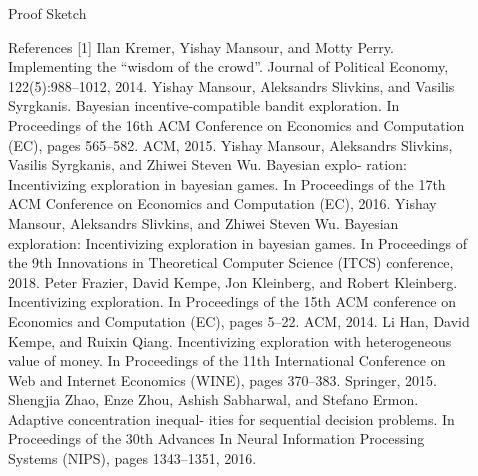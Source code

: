 \documentclass[final]{beamer}
\newlength{\sepwid}
\newlength{\onecolwid}
\begin{document}
\begin{frame}[t]
\begin{columns}[t]
\begin{column}{\onecolwid}
\begin{block}{Proof Sketch}
\end{block}
\begin{block}{References}
[1] Ilan Kremer, Yishay Mansour, and Motty Perry. Implementing the “wisdom of the crowd”. Journal of Political Economy, 122(5):988–1012, 2014. \newline
[2] Yishay Mansour, Aleksandrs Slivkins, and Vasilis Syrgkanis. Bayesian incentive-compatible bandit exploration. In Proceedings of the 16th ACM Conference on Economics and Computation (EC), pages 565–582. ACM, 2015. \newline
[3] Yishay Mansour, Aleksandrs Slivkins, Vasilis Syrgkanis, and Zhiwei Steven Wu. Bayesian explo- ration: Incentivizing exploration in bayesian games. In Proceedings of the 17th ACM Conference on Economics and Computation (EC), 2016. \newline
[4] Yishay Mansour, Aleksandrs Slivkins, and Zhiwei Steven Wu. Bayesian exploration: Incentivizing exploration in bayesian games. In Proceedings of the 9th Innovations in Theoretical Computer Science (ITCS) conference, 2018. \newline
[5] Peter Frazier, David Kempe, Jon Kleinberg, and Robert Kleinberg. Incentivizing exploration. In Proceedings of the 15th ACM conference on Economics and Computation (EC), pages 5–22. ACM, 2014. \newline
[6] Li Han, David Kempe, and Ruixin Qiang. Incentivizing exploration with heterogeneous value of money. In Proceedings of the 11th International Conference on Web and Internet Economics (WINE), pages 370–383. Springer, 2015. \newline
[7] Shengjia Zhao, Enze Zhou, Ashish Sabharwal, and Stefano Ermon. Adaptive concentration inequal- ities for sequential decision problems. In Proceedings of the 30th Advances In Neural Information Processing Systems (NIPS), pages 1343–1351, 2016.
\end{block}


\end{column} %


\begin{column}{\sepwid}\end{column} %

\begin{column}{\onecolwid} %


\end{column} %

\end{columns} %

\end{frame} %
\end{document}
